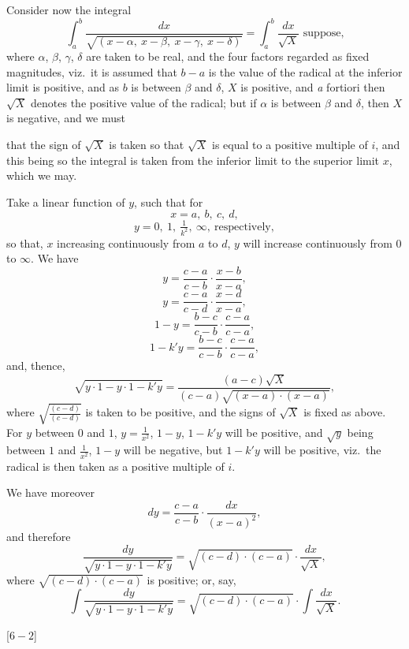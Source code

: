 \documentclass[12pt,a4paper,oneside]{book}
\newcommand{\paperref}[1]{\par\noindent\hfill[#1]\hfill\null\par}
\theoremstyle{plain}
\theoremstyle{definition}
\theoremstyle{remark}
\begin{document}
Consider now the integral
\[
\int_a^b\frac{dx}{\sqrt{(x-\alpha,\ x-\beta,\ x-\gamma,\ x-\delta)}}=\int_a^b\frac{dx}{\sqrt{X}}\text{ suppose,}
\]
where $\alpha$, $\beta$, $\gamma$, $\delta$ are taken to be real, and the four factors regarded as fixed magnitudes, viz.\ it is assumed that $b-a$ is the value of the radical at the inferior limit is positive, and as $b$ is between $\beta$ and $\delta$, $X$ is positive, and \textit{a} fortiori then $\sqrt{X}$ denotes the positive value of the radical; but if $\alpha$ is between $\beta$ and $\delta$, then $X$ is negative, and we must

\newpage
that the sign of $\sqrt{X}$ is taken so that $\sqrt{X}$ is equal to a positive multiple of $i$, and this being so the integral is taken from the inferior limit to the superior limit $x$, which we may.

Take a linear function of $y$, such that for
\[
x=a,\ b,\ c,\ d,
\]
\[
y=0,\ 1,\ \tfrac{1}{k^2},\ \infty,\ \text{respectively},
\]
so that, $x$ increasing continuously from $a$ to $d$, $y$ will increase continuously from $0$ to $\infty$. We have
\[
y=\frac{c-a}{c-b}\cdot\frac{x-b}{x-a},
\]
\[
y=\frac{c-a}{c-d}\cdot\frac{x-d}{x-a},
\]
\[
1-y=\frac{b-c}{c-b}\cdot\frac{c-a}{c-a},
\]
\[
1-k'y=\frac{b-c}{c-b}\cdot\frac{c-a}{c-a},
\]
and, thence,
\[
\sqrt{y\cdot 1-y\cdot 1-k'y}=\frac{(a-c)\sqrt{X}}{(c-a)\sqrt{(x-a)\cdot(x-a)}},
\]
where $\sqrt{\frac{(c-d)}{(c-d)}}$ is taken to be positive, and the signs of $\sqrt{X}$ is fixed as above. For $y$ between $0$ and $1$, $y=\frac{1}{x^2}$, $1-y$, $1-k'y$ will be positive, and $\sqrt{y}$ being between $1$ and $\frac{1}{x^2}$, $1-y$ will be negative, but $1-k'y$ will be positive, viz.\ the radical is then taken as a positive multiple of $i$.

We have moreover
\[
dy=\frac{c-a}{c-b}\cdot\frac{dx}{(x-a)^2},
\]
and therefore
\[
\frac{dy}{\sqrt{y\cdot 1-y\cdot 1-k'y}}=\sqrt{(c-d)\cdot(c-a)}\cdot\frac{dx}{\sqrt{X}},
\]
where $\sqrt{(c-d)\cdot(c-a)}$ is positive; or, say,
\[
\int\frac{dy}{\sqrt{y\cdot 1-y\cdot 1-k'y}}=\sqrt{(c-d)\cdot(c-a)}\cdot\int\frac{dx}{\sqrt{X}}.
\]

\paperref{\hfill $6-2$}
\end{document}
